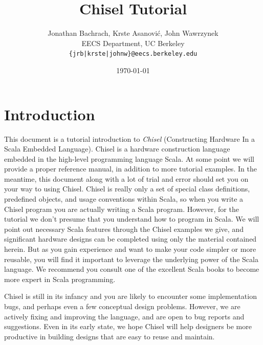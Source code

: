 \documentclass[twocolumn,10pt]{article}
\title{Chisel Tutorial}
\author{Jonathan Bachrach, Krste Asanovi\'{c}, John Wawrzynek \\
EECS Department, UC Berkeley\\
{\tt  \{jrb|krste|johnw\}@eecs.berkeley.edu}
}
\date{\today}
\begin{document}
\maketitle{}


\section{Introduction}

This document is a tutorial introduction to {\em Chisel} (Constructing
Hardware In a Scala Embedded Language).  Chisel is a hardware
construction language embedded in the high-level programming language
Scala.  At some point we will provide a proper reference manual, in
addition to more tutorial examples.  In the meantime, this document
along with a lot of trial and error should set you on your way to
using Chisel.  Chisel is really only a set of special class
definitions, predefined objects, and usage conventions within Scala,
so when you write a Chisel program you are actually writing a Scala
program.  However, for the tutorial we don't presume that you
understand how to program in Scala.  We will point out necessary Scala
features through the Chisel examples we give, and significant hardware
designs can be completed using only the material contained herein.
But as you gain experience and want to make your code simpler or more
reusable, you will find it important to leverage the underlying power
of the Scala language. We recommend you consult one of the excellent
Scala books to become more expert in Scala programming.

Chisel is still in its infancy and you are likely to encounter some
implementation bugs, and perhaps even a few conceptual design
problems.  However, we are actively fixing and improving the language,
and are open to bug reports and suggestions.  Even in its early state,
we hope Chisel will help designers be more productive in building
designs that are easy to reuse and maintain.
\end{document}

